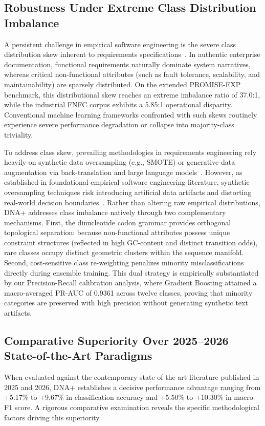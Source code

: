\subsection{Robustness Under Extreme Class Distribution Imbalance}
A persistent challenge in empirical software engineering is the severe class distribution skew inherent to requirements specifications~\cite{ref17,ref20}. In authentic enterprise documentation, functional requirements naturally dominate system narratives, whereas critical non-functional attributes (such as fault tolerance, scalability, and maintainability) are sparsely distributed. On the extended PROMISE-EXP benchmark, this distributional skew reaches an extreme imbalance ratio of 37.0:1, while the industrial FNFC corpus exhibits a 5.85:1 operational disparity. Conventional machine learning frameworks confronted with such skews routinely experience severe performance degradation or collapse into majority-class triviality.

To address class skew, prevailing methodologies in requirements engineering rely heavily on synthetic data oversampling (e.g., SMOTE) or generative data augmentation via back-translation and large language models~\cite{ref16,ref27,ref28}. However, as established in foundational empirical software engineering literature, synthetic oversampling techniques risk introducing artificial data artifacts and distorting real-world decision boundaries~\cite{ref18,ref19}. Rather than altering raw empirical distributions, DNA+ addresses class imbalance natively through two complementary mechanisms. First, the dinucleotide codon grammar provides orthogonal topological separation: because non-functional attributes possess unique constraint structures (reflected in high GC-content and distinct transition odds), rare classes occupy distinct geometric clusters within the sequence manifold. Second, cost-sensitive class re-weighting penalizes minority misclassifications directly during ensemble training. This dual strategy is empirically substantiated by our Precision-Recall calibration analysis, where Gradient Boosting attained a macro-averaged PR-AUC of 0.9361 across twelve classes, proving that minority categories are preserved with high precision without generating synthetic text artifacts.

\subsection{Comparative Superiority Over 2025--2026 State-of-the-Art Paradigms}
When evaluated against the contemporary state-of-the-art literature published in 2025 and 2026, DNA+ establishes a decisive performance advantage ranging from +5.17\% to +9.67\% in classification accuracy and +5.50\% to +10.30\% in macro-F1 score. A rigorous comparative examination reveals the specific methodological factors driving this superiority.

